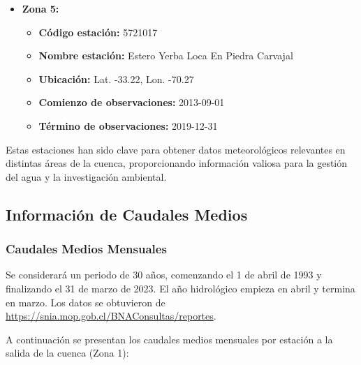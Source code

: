 \documentclass{article} %
\begin{document}
\begin{itemize}
    \item \textbf{Zona 5:}
    \begin{itemize}
        \item \textbf{Código estación:} 5721017
        \item \textbf{Nombre estación:} Estero Yerba Loca En Piedra Carvajal
        \item \textbf{Ubicación:} Lat. -33.22, Lon. -70.27
        \item \textbf{Comienzo de observaciones:} 2013-09-01
        \item \textbf{Término de observaciones:} 2019-12-31
    \end{itemize}
\end{itemize}

Estas estaciones han sido clave para obtener datos meteorológicos relevantes en distintas áreas de la cuenca, proporcionando información valiosa para la gestión del agua y la investigación ambiental.

\newpage
\subsection{Información de Caudales Medios}

\subsubsection{Caudales Medios Mensuales}

Se considerará un periodo de 30 años, comenzando el 1 de abril de 1993 y finalizando el 31 de marzo de 2023. El año hidrológico empieza en abril y termina en marzo. Los datos se obtuvieron de \url{https://snia.mop.gob.cl/BNAConsultas/reportes}.

A continuación se presentan los caudales medios mensuales por estación a la salida de la cuenca (Zona 1):
\end{document}
